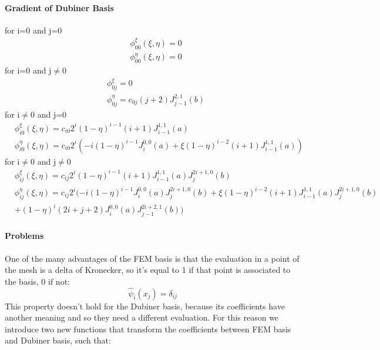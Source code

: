 \documentclass[a4paper]{article}
\theoremstyle{definition}
\begin{document}
\paragraph{Gradient of Dubiner Basis}
	for i=0 and j=0
	\begin{equation}
	\begin{split}
	&\phi_{00}^{\xi}(\xi,\eta)=0
	\\&\phi_{00}^{\eta}(\xi,\eta)=0
	\end{split}
	\end{equation}
	for i=0 and j$\neq$0
	\begin{equation}
	\begin{split}
	&\phi_{0j}^{\xi}=0
	\\&\phi_{0j}^{\eta}=c_{0j} (j+2) J_{j-1}^{2,1}(b)
	\end{split}
	\end{equation}
	for i$\neq$0 and j=0
	\begin{equation}
	\begin{split}
	&\phi_{i0}^{\xi}(\xi,\eta)=c_{i0} 2^{i} (1-\eta)^{i-1} (i+1) J_{i-1}^{1,1}(a)
	\\&\phi_{i0}^{\eta}(\xi,\eta)=c_{i0} 2^{i} (-i(1-\eta)^{i-1} J_{i}^{0,0}(a)+\xi(1-\eta)^{i-2}(i+1) J_{i-1}^{1,1}(a))
	\end{split}
	\end{equation}
	for i$\neq$0 and j$\neq$0
	\begin{equation}
	\begin{split}
	&\phi_{ij}^{\xi}(\xi,\eta)=c_{ij} 2^{i} (1-\eta)^{i-1} (i+1) J_{i-1}^{1,1}(a) J_{j}^{2i+1,0}(b)
	\\&\phi_{ij}^{\eta}(\xi,\eta)=c_{ij} 2^{i} (-i(1-\eta)^{i-1} J_{i}^{0,0}(a) J_{j}^{2i+1,0}(b)+\xi(1-\eta)^{i-2}(i+1) J_{i-1}^{1,1}(a) J_{j}^{2i+1,0}(b)
	\\&+(1-\eta)^{i}(2i+j+2) J_{i}^{0,0}(a) J_{j-1}^{2i+2,1}(b))
	\end{split}
	\end{equation}
\paragraph{Problems}
	One of the many advantages of the FEM basis is that the evaluation in a point of the mesh is a delta of Kronecker, so it's equal to 1 if that point is associated to the basis, 0 if not:
	\begin{equation}
	\hat{\psi}_i(x_j)=\delta_{ij}
	\end{equation}
	This property doesn't hold for the Dubiner basis, because its coefficients have another meaning and so they need a different evaluation.
	For this reason we introduce two new functions that transform the coefficients between FEM basis and Dubiner basis, such that:
\end{document}
